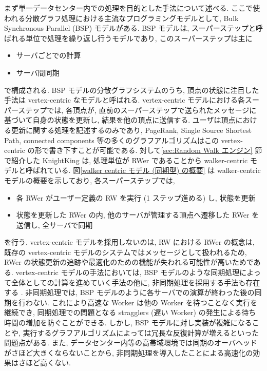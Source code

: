 まず単一データセンター内での処理を目的とした手法について述べる. ここで使われる分散グラフ処理における主流なプログラミングモデルとして, Bulk Synchronous Parallel (BSP) モデルがある. BSP モデルは, スーパーステップと呼ばれる単位で処理を繰り返し行うモデルであり, このスーパーステップは主に
\begin{itemize}
    \item サーバごとでの計算
    \item サーバ間同期
\end{itemize}
で構成される. BSP モデルの分散グラフシステムのうち, 頂点の状態に注目した手法\cite{Pregel}\cite{10.1145/2741948.2741970}\cite{10.5555/2387880.2387883}\cite{10.5555/3026877.3026901}\cite{Gluon}は vertex-centric なモデルと呼ばれる. vertex-centric モデルにおける各スーパーステップでは, 各頂点が, 直前のスーパーステップで送られたメッセージに基づいて自身の状態を更新し, 結果を他の頂点に送信する. ユーザは頂点における更新に関する処理を記述するのみであり, PageRank, Single Source Shortest Path, connected components 等の多くのグラフアルゴリズムはこの vertex-centric の形で書き下すことが可能である. 対して\ref{sec:Random Walk エンジン} 節で紹介した KnightKing は, 処理単位が RWer であることから walker-centric モデルと呼ばれている. 図\ref{walker centric モデル (同期型) の概要} は walker-centric モデルの概要を示しており, 各スーパーステップでは, 
\begin{itemize}
    \item 各 RWer がユーザー定義の RW を実行 (1 ステップ進める) し, 状態を更新
    \item 状態を更新した RWer の内, 他のサーバが管理する頂点へ遷移した RWer を送信し, 全サーバで同期
\end{itemize}
を行う. vertex-centric モデルを採用しないのは, RW における RWer の概念は, 既存の vertex-centric モデルのシステムではメッセージとして扱われるため, RWer の状態更新の追跡や最適化のための機能が失われる可能性が高いためである. vertex-centric モデルの手法においては, BSP モデルのような同期処理によって全体としての計算を進めていく手法の他に, 非同期処理を採用する手法も存在する \cite{BAP}\cite{AAP}\cite{Gluon-Async} .  非同期処理では, BSP モデルのように各サーバでの演算が終わった後の同期を行わない. これにより高速な Worker は他の Worker を待つことなく実行を継続でき, 同期処理での問題となる stragglers (遅い Worker) の発生による待ち時間の増加を防ぐことができる. しかし, BSP モデルに対し実装が複雑になることや, 実行するグラフアルゴリズムによっては冗長な反復計算が増えるといった問題点がある. また, データセンター内等の高帯域環境では同期のオーバヘッドがさほど大きくならないことから, 非同期処理を導入したことによる高速化の効果はさほど高くない. 

